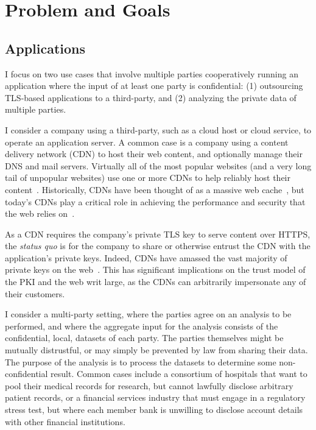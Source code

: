 \section{Problem and Goals}
\label{sec:background}

\subsection{Applications}

I focus on two use cases that involve multiple parties cooperatively running
an application where the input of at least one party is confidential:
(1) outsourcing TLS-based applications to a third-party, and (2)
analyzing the private data of multiple parties.


I consider a company using a third-party, such as a cloud host or cloud
service, to operate an application server.
%
A common case is a company using a content delivery network (CDN) to
host their web content, and optionally manage their DNS and mail servers.
%
Virtually all of the most popular websites (and a very long tail
of unpopular websites) use one or more CDNs to help reliably host
their content~\cite{key-sharing}. 
%
Historically, CDNs have been thought of as a massive web
cache~\cite{cdn-on-demand}, but today’s CDNs play a critical role in achieving
the performance and security that the web relies on~\cite{securing-cdns}.

As a CDN requires the company's private TLS key to serve content over HTTPS,
the \emph{status quo} is for the company to share or otherwise entrust the CDN
with the application's private keys.
%
Indeed, CDNs have amassed the vast majority of private keys on the
web~\cite{key-sharing,when-https-meets-cdn}.
%
This has significant implications on the trust model of the PKI and the web
writ large, as the CDNs  can arbitrarily impersonate any of their customers.


I consider a multi-party setting, where the parties agree on an analysis to be
performed, and where the aggregate input for the analysis consists of the
confidential, local, datasets of each party.
% 
The parties themselves might be mutually distrustful, or may simply be
prevented by law from sharing their data.
%
The purpose of the analysis is to process the datasets to determine some
non-confidential result.
%
Common cases include a consortium of hospitals that want to pool their medical
records for research, but cannot lawfully disclose arbitrary patient records,
or a financial services industry  that must engage in a regulatory stress test,
but where each member bank is unwilling to disclose account details
with other financial institutions.


